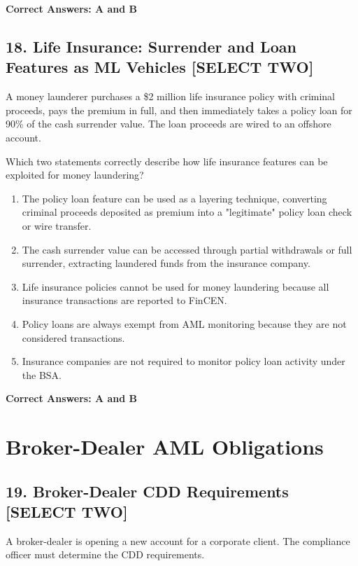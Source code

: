\documentclass[11pt,a4paper]{article}
\begin{document}
	\textbf{Correct Answers: A and B}
	
	\subsection{18. Life Insurance: Surrender and Loan Features as ML Vehicles \textnormal{[SELECT TWO]}}
	
	A money launderer purchases a \$2 million life insurance policy with criminal proceeds, pays the premium in full, and then immediately takes a policy loan for 90\% of the cash surrender value. The loan proceeds are wired to an offshore account.
	
	Which two statements correctly describe how life insurance features can be exploited for money laundering?
	
	\begin{enumerate}[label=\Alph*.]
		\item The policy loan feature can be used as a layering technique, converting criminal proceeds deposited as premium into a "legitimate" policy loan check or wire transfer.
		\item The cash surrender value can be accessed through partial withdrawals or full surrender, extracting laundered funds from the insurance company.
		\item Life insurance policies cannot be used for money laundering because all insurance transactions are reported to FinCEN.
		\item Policy loans are always exempt from AML monitoring because they are not considered transactions.
		\item Insurance companies are not required to monitor policy loan activity under the BSA.
	\end{enumerate}
	
	\textbf{Correct Answers: A and B}
	
	\section{Broker-Dealer AML Obligations}
	
	\subsection{19. Broker-Dealer CDD Requirements \textnormal{[SELECT TWO]}}
	
	A broker-dealer is opening a new account for a corporate client. The compliance officer must determine the CDD requirements.
	
\end{document}
